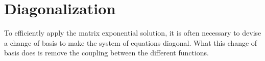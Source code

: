 \section{Diagonalization}

To efficiently apply the matrix exponential solution, it is often necessary to devise a change of basis to make the system of equations diagonal. What this change of basis does is remove the coupling between the different functions. 

